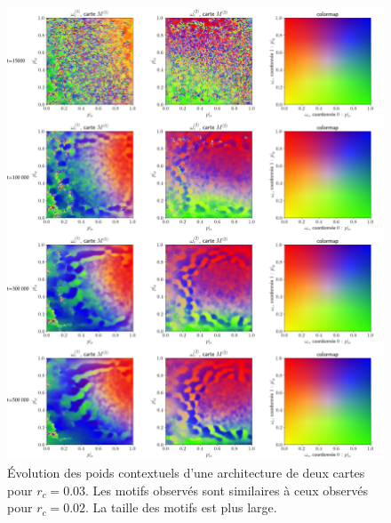 \documentclass[../main]{subfiles}
\begin{document}
\begin{figure}[p]
	\includegraphics[width=\textwidth]{2SOM_sphere_rc003_evol.pdf}
	\caption{\'Evolution des poids contextuels d'une architecture de deux cartes pour $r_c =0.03$. Les motifs observés sont similaires à ceux observés pour $r_c = 0.02$. La taille des motifs est plus large. \label{fig:rc_003}}
\end{figure}
\end{document}
